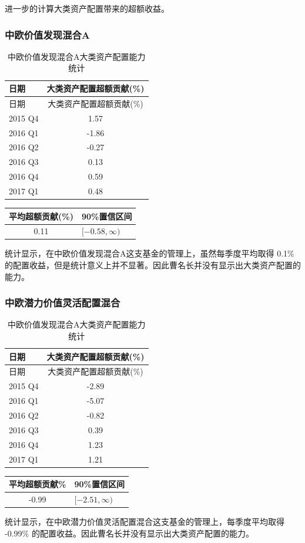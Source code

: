 \documentclass[hyperref,]{ctexart}
\begin{document}
进一步的计算大类资产配置带来的超额收益。

\subsubsection{中欧价值发现混合A}\label{a-1}

\begin{longtable}[]{@{}lc@{}}
\caption{中欧价值发现混合A大类资产配置能力统计}\tabularnewline
\toprule
日期 & 大类资产配置超额贡献(\%)\tabularnewline
\midrule
\endfirsthead
\toprule
日期 & 大类资产配置超额贡献(\%)\tabularnewline
\midrule
\endhead
2015 Q4 & 1.57\tabularnewline
2016 Q1 & -1.86\tabularnewline
2016 Q2 & -0.27\tabularnewline
2016 Q3 & 0.13\tabularnewline
2016 Q4 & 0.59\tabularnewline
2017 Q1 & 0.48\tabularnewline
\bottomrule
\end{longtable}

\begin{longtable}[]{@{}cl@{}}
\toprule
平均超额贡献(\%) & 90\%置信区间\tabularnewline
\midrule
\endhead
0.11 & \([-0.58,\infty)\)\tabularnewline
\bottomrule
\end{longtable}

统计显示，在中欧价值发现混合A这支基金的管理上，虽然每季度平均取得 0.1\%
的配置收益，但是统计意义上并不显著。因此曹名长并没有显示出大类资产配置的能力。

\subsubsection{中欧潜力价值灵活配置混合}\label{-1}

\begin{longtable}[]{@{}lc@{}}
\caption{中欧价值发现混合A大类资产配置能力统计}\tabularnewline
\toprule
日期 & 大类资产配置超额贡献(\%)\tabularnewline
\midrule
\endfirsthead
\toprule
日期 & 大类资产配置超额贡献(\%)\tabularnewline
\midrule
\endhead
2015 Q4 & -2.89\tabularnewline
2016 Q1 & -5.07\tabularnewline
2016 Q2 & -0.82\tabularnewline
2016 Q3 & 0.39\tabularnewline
2016 Q4 & 1.23\tabularnewline
2017 Q1 & 1.21\tabularnewline
\bottomrule
\end{longtable}

\begin{longtable}[]{@{}cl@{}}
\toprule
平均超额贡献\% & 90\%置信区间\tabularnewline
\midrule
\endhead
-0.99 & \([-2.51,\infty)\)\tabularnewline
\bottomrule
\end{longtable}

统计显示，在中欧潜力价值灵活配置混合这支基金的管理上，每季度平均取得
-0.99\% 的配置收益。因此曹名长并没有显示出大类资产配置的能力。
\end{document}
